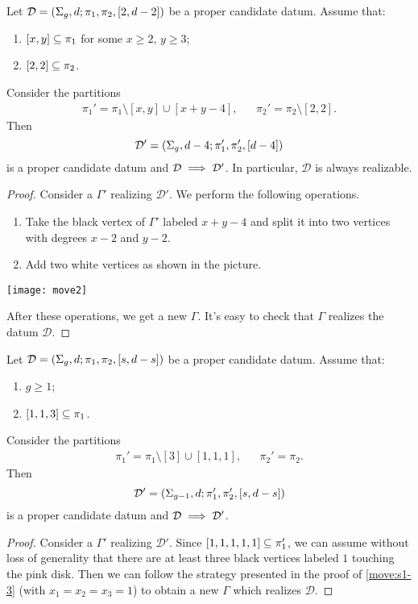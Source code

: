\documentclass{article}
\begin{document}
\begin{combinatorialmove}\label{move:s2-23-22}
Let $\mathcal{D}=\left(\Sigma_g,d;\pi_1,\pi_2,[2,d-2]\right)$ be a proper candidate datum. Assume that:
\begin{enumerate}
\item $[x,y]\subseteq\pi_1$ for some $x\ge 2$, $y\ge 3$;
\item $[2,2]\subseteq\pi_2$.
\end{enumerate}
Consider the partitions
\begin{align*}
\pi_1'=\pi_1\setminus[x,y]\cup[x+y-4],&&\pi_2'=\pi_2\setminus[2,2].
\end{align*}
Then
\[
\mathcal{D'}=\left(\Sigma_g,d-4;\pi_1',\pi_2',[d-4]\right)
\]
is a proper candidate datum and $\mathcal{D}\implies\mathcal{D}'$. In particular, $\mathcal{D}$ is always realizable.
\end{combinatorialmove}
\begin{proof}
Consider a \dessin{} $\Gamma'$ realizing $\mathcal{D}'$. We perform the following operations.
\begin{enumerate}
\item Take the black vertex of $\Gamma'$ labeled $x+y-4$ and split it into two vertices with degrees $x-2$ and $y-2$.
\item Add two white vertices as shown in the picture.
\end{enumerate}
\begin{center}
\texttt{[image: move2]}
\end{center}
After these operations, we get a new \dessin{} $\Gamma$. It's easy to check that $\Gamma$ realizes the datum $\mathcal{D}$.
\end{proof}

\begin{combinatorialmove}\label{move:113}
Let $\mathcal{D}=\left(\Sigma_g,d;\pi_1,\pi_2,[s,d-s]\right)$ be a proper candidate datum. Assume that:
\begin{enumerate}
\item $g\ge 1$;
\item $[1,1,3]\subseteq\pi_1$.
\end{enumerate}
Consider the partitions
\begin{align*}
\pi_1'=\pi_1\setminus[3]\cup[1,1,1],&&\pi_2'=\pi_2.
\end{align*}
Then
\[
\mathcal{D'}=\left(\Sigma_{g-1},d;\pi_1',\pi_2',[s,d-s]\right)
\]
is a proper candidate datum and $\mathcal{D}\implies\mathcal{D}'$.
\end{combinatorialmove}
\begin{proof}
Consider a \dessin{} $\Gamma'$ realizing $\mathcal{D}'$. Since $[1,1,1,1,1]\subseteq\pi_1'$, we can assume without loss of generality that there are at least three black vertices labeled $1$ touching the pink disk. Then we can follow the strategy presented in the proof of \cref{move:s1-3} (with $x_1=x_2=x_3=1$) to obtain a new \dessin{} $\Gamma$ which realizes $\mathcal{D}$.
\end{proof}
\end{document}
